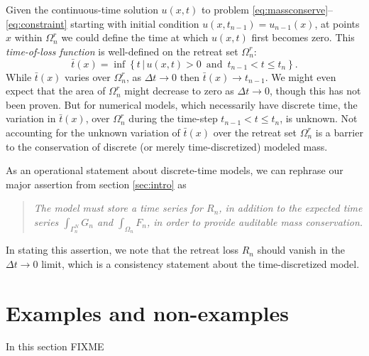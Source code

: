 \documentclass[final,leqno,onefignum,onetabnum]{siamltex1213bueler}
\begin{document}
Given the continuous-time solution $u(x,t)$ to problem \eqref{eq:massconserve}--\eqref{eq:constraint} starting with initial condition $u(x,t_{n-1}) = u_{n-1}(x)$, at points $x$ within $\Omega_n^r$ we could define the time at which $u(x,t)$ first becomes zero.  This \emph{time-of-loss function} is well-defined on the retreat set $\Omega_n^r$:
\begin{equation}
\bar t(x) = \inf\left\{t \,\big|\, u(x,t)>0 \,\text{ and }\, t_{n-1} < t \le t_n\right\}.
\end{equation}
While $\bar t(x)$ varies over $\Omega_n^r$, as $\Delta t \to 0$ then $\bar t(x) \to t_{n-1}$.  We might even expect that the area of $\Omega_n^r$ might decrease to zero as $\Delta t \to 0$, though this has not been proven.  But for numerical models, which necessarily have discrete time, the variation in $\bar t(x)$, over $\Omega_n^r$ during the time-step $t_{n-1} < t \le t_n$, is unknown.  Not accounting for the unknown variation of $\bar t(x)$ over the retreat set $\Omega_n^r$ is a barrier to the conservation of discrete (or merely time-discretized) modeled mass.

As an operational statement about discrete-time models, we can rephrase our major assertion from section \ref{sec:intro} as
\begin{quote}
\emph{The model must store a time series for $R_n$, in addition to the expected time series $\int_{\Gamma_n^N} G_n$ and $\int_{\Omega_n} F_n$, in order to provide auditable mass conservation.}
\end{quote}
In stating this assertion, we note that the retreat loss $R_n$ should vanish in the $\Delta t\to 0$ limit, which is a consistency statement about the time-discretized model.


\section{Examples and non-examples} \label{sec:examples}

In this section FIXME
\end{document}
